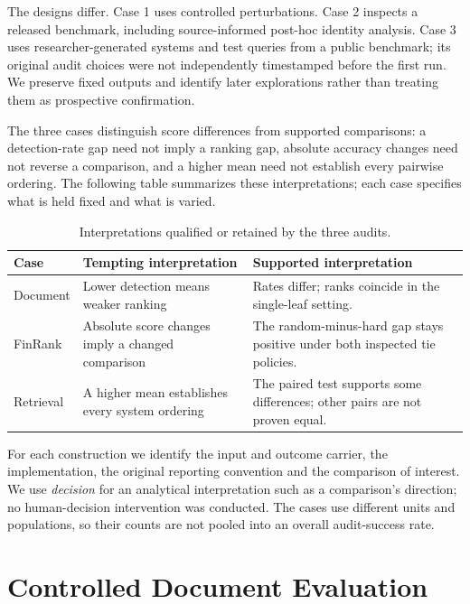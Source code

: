 \documentclass[runningheads]{llncs}
\begin{document}
The designs differ. Case 1 uses controlled perturbations. Case 2
inspects a released benchmark, including source-informed post-hoc
identity analysis. Case 3 uses researcher-generated systems and test
queries from a public benchmark; its original audit choices were not
independently timestamped before the first run. We preserve fixed
outputs and identify later explorations rather than treating them as
prospective confirmation.

The three cases distinguish score differences from supported
comparisons: a detection-rate gap need not imply a ranking gap, absolute
accuracy changes need not reverse a comparison, and a higher mean need
not establish every pairwise ordering. The following table summarizes
these interpretations; each case specifies what is held fixed and what
is varied.

\begin{table}[htbp]
\caption{Interpretations qualified or retained by the three audits.}
\label{tab:interpretations}
\centering
\footnotesize
\renewcommand{\arraystretch}{1.12}
\begin{tabular}{@{}>{\raggedright\arraybackslash}p{}>{\raggedright\arraybackslash}p{}>{\raggedright\arraybackslash}p{}@{}}
\hline
Case & Tempting interpretation & Supported interpretation \\
\hline
Document & Lower detection means weaker ranking & Rates differ; ranks coincide in the single-leaf setting. \\
FinRank & Absolute score changes imply a changed comparison & The random-minus-hard gap stays positive under both inspected tie policies. \\
Retrieval & A higher mean establishes every system ordering & The paired test supports some differences; other pairs are not proven equal. \\
\hline
\end{tabular}
\end{table}

For each construction we identify the input and outcome carrier, the
implementation, the original reporting convention and the comparison of
interest. We use \emph{decision} for an analytical interpretation such
as a comparison's direction; no human-decision intervention was
conducted. The cases use different units and populations, so their
counts are not pooled into an overall audit-success rate.

\section{Controlled Document
Evaluation}\label{controlled-document-evaluation}
\end{document}
